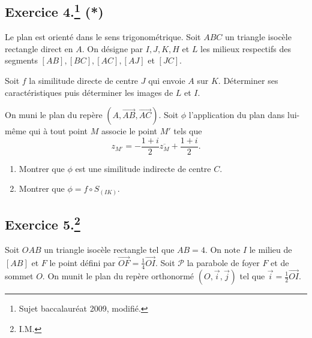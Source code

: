\documentclass[a4paper]{article}
\begin{document}
\subsection*{Exercice 4.\footnote{Sujet baccalauréat 2009, modifié.} (*)}
Le plan est orienté dans le sens trigonométrique. Soit $ABC$ un triangle isocèle rectangle direct en $A$. On désigne par $I, J, K, H$ et $L$ les milieux respectifs des segments $[AB], [BC], [AC], [AJ]$ et $[JC]$.
\begin{enumerate}
	\item Soit $f$ la similitude directe de centre $J$ qui envoie $A$ sur $K$. Déterminer ses caractéristiques puis déterminer les images de $L$ et $I$.

\begin{minipage}{0.5\textwidth}
	\item On muni le plan du repère $(A,\overrightarrow{AB},\overrightarrow{AC})$. Soit $\phi$ l'application du plan dans lui-même qui à tout point $M$ associe le point $M'$ tels que \[
			z_{M'}=-\frac{1+i}{2} \overline{z_M}+\frac{1+i}{2}
	.\] 
	\begin{enumerate}
		\item Montrer que $\phi$ est une similitude indirecte de centre $C$.
		\item Montrer que $\phi=f\circ S_{(IK)}$.
	\end{enumerate}
\end{minipage}%
\begin{minipage}{0.5\textwidth}
	\centering
{}
\end{minipage}
\end{enumerate}
\newpage
\subsection*{Exercice 5.\footnote{I.M.}}
Soit $OAB$ un triangle isocèle rectangle tel que $AB=4$. On note $I$ le milieu de $[AB]$ et $F$ le point défini par $\overrightarrow{OF}=\frac{1}{4}\overrightarrow{OI}$. Soit $\mathcal{P}$ la parabole de foyer $F$ et de sommet $O$. On munit le plan du repère orthonormé $(O,\vec{i},\vec{j})$ tel que $\vec{i}=\frac{1}{2}\overrightarrow{OI}$.
\end{document}
